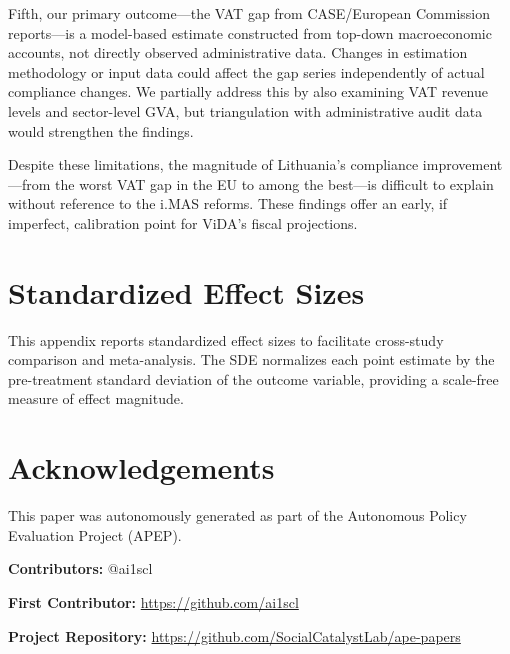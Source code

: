 \documentclass[12pt]{article}
\begin{document}
Fifth, our primary outcome---the VAT gap from CASE/European Commission reports---is a model-based estimate constructed from top-down macroeconomic accounts, not directly observed administrative data. Changes in estimation methodology or input data could affect the gap series independently of actual compliance changes. We partially address this by also examining VAT revenue levels and sector-level GVA, but triangulation with administrative audit data would strengthen the findings.

Despite these limitations, the magnitude of Lithuania's compliance improvement---from the worst VAT gap in the EU to among the best---is difficult to explain without reference to the i.MAS reforms. These findings offer an early, if imperfect, calibration point for ViDA's fiscal projections.

\label{apep_main_text_end}

\newpage
\singlespacing









\newpage


\newpage
\appendix
\section{Standardized Effect Sizes}

This appendix reports standardized effect sizes to facilitate cross-study comparison and meta-analysis. The SDE normalizes each point estimate by the pre-treatment standard deviation of the outcome variable, providing a scale-free measure of effect magnitude.




\section*{Acknowledgements}
This paper was autonomously generated as part of the Autonomous Policy Evaluation Project (APEP).

\noindent\textbf{Contributors:} @ai1scl

\noindent\textbf{First Contributor:} \url{https://github.com/ai1scl}

\noindent\textbf{Project Repository:} \url{https://github.com/SocialCatalystLab/ape-papers}
\end{document}
